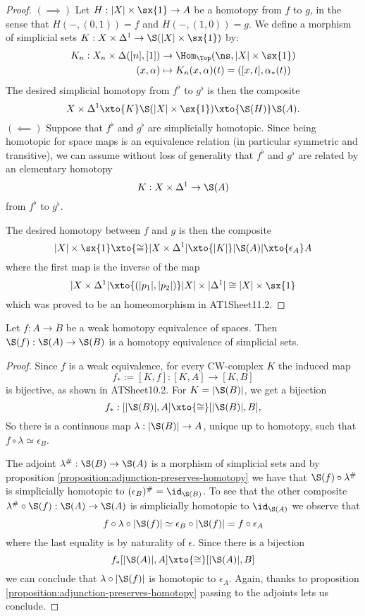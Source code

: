 \begin{proof}
$(\implies)$ Let $H:|X|\times\sx{1}\to A$ be a homotopy from $f$ to $g$, in the sense that $H(-,(0,1))=f$ and $H(-,(1,0))=g$. We define a morphism of simplicial sets $K:X\times\Delta^1\to\S(|X|\times\sx{1})$ by:
\begin{align*}
    K_n:X_n\times\Delta([n],[1])&\to\Hom_\Top(\ns,|X|\times\sx{1})\\
    (x,\alpha)&\mapsto K_n(x,\alpha)(t)=([x,t],\alpha_*(t))
\end{align*}
The desired simplicial homotopy from $f^\flat$ to $g^\flat$ is then the composite
\[X\times\Delta^1\xto{K}\S(|X|\times\sx{1})\xto{\S(H)}\S(A).\]
$(\impliedby)$ Suppose that $f^\flat$ and $g^\flat$ are simplicially homotopic. Since being homotopic for space maps is an equivalence relation (in particular symmetric and transitive), we can assume without loss of generality that $f^\flat$ and $g^\flat$ are related by an elementary homotopy
\[K:X\times\Delta^1\to\S(A)\]
from $f^\flat$ to $g^\flat$.

The desired homotopy between $f$ and $g$ is then the composite
\[|X|\times\sx{1}\xto{\cong}|X\times\Delta^1|\xto{|K|}|\S(A)|\xto{\epsilon_A}A\]
where the first map is the inverse of the map
\[|X\times\Delta^1|\xto{(|p_1|,|p_2|)}|X|\times|\Delta^1|\cong|X|\times\sx{1}\]
which was proved to be an homeomorphism in AT1Sheet11.2.
\end{proof}

\begin{theorem}\label{theore:singular-complex-functor-is-homotopical}
Let $f:A\to B$ be a weak homotopy equivalence of spaces. Then $\S(f):\S(A)\to\S(B)$ is a homotopy equivalence of simplicial sets.
\end{theorem}

\begin{proof}
Since $f$ is a weak equivalence, for every CW-complex $K$ the induced map
\[f_*:=[K,f]:[K,A]\to[K,B]\]
is bijective, as shown in ATSheet10.2. For $K=|\S(B)|$, we get a bijection
\[
f_*:[|\S(B)|,A]\xto{\cong}[|\S(B)|,B],
\]
So there is a continuous map $\lambda:|\S(B)|\to A$, unique up to homotopy, such that $f\circ\lambda\simeq\epsilon_B$.

The adjoint $\lambda^\#:\S(B)\to\S(A)$ is a morphism of simplicial sets and by proposition \ref{proposition:adjunction-preserves-homotopy} we have that $\S(f)\circ\lambda^\#$ is simplicially homotopic to $(\epsilon_B)^\#=\id_{\S(B)}$. To see that the other composite $\lambda^\#\circ\S(f):\S(A)\to\S(A)$ is simplicially homotopic to $\id_{\S(A)}$ we observe that
\[f\circ\lambda\circ|\S(f)|\simeq\epsilon_B\circ|\S(f)|=f\circ\epsilon_A\]
where the last equality is by naturality of $\epsilon$. Since there is a bijection
\[f_*[|\S(A)|,A]\xto{\cong}[|\S(A)|,B]\]
we can conclude that $\lambda\circ|\S(f)|$ is homotopic to $\epsilon_A$. Again, thanks to proposition \ref{proposition:adjunction-preserves-homotopy} passing to the adjoints lets us conclude.
\end{proof}


